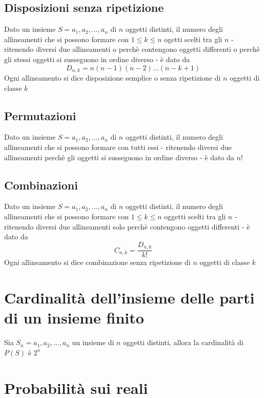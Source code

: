 \documentclass[12pt]{report}
\begin{document}
  \subsection{Disposizioni senza ripetizione}
  Dato un insieme $S={a_1,a_2,...,a_n}$ di $n$ oggetti distinti, il numero degli allineamenti che si possono formare con $1 \leq k \leq n$ ogetti scelti tra gli $n$ - ritenendo diversi due allineamenti o perchè contengono oggetti differenti o perchè gli stessi oggetti si susseguono in ordine diverso - è dato da
  \[ D_{n,k} = n(n-1)(n-2)...(n-k + 1) \]
  Ogni allineamento si dice disposizione semplice o senza ripetizione di $n$ oggetti di classe $k$

  \subsection{Permutazioni}
  Dato un insieme $S={a_1,a_2,...,a_n}$ di $n$ oggetti distinti, il numero degli allineamenti che si possono formare con tutti essi - ritenendo diversi due allineamenti perchè gli oggetti si susseguono in ordine diverso - è dato da $n!$

  \subsection{Combinazioni}
  Dato un insieme $S={a_1,a_2,...,a_n}$ di $n$ oggetti distinti, il numero degli allineamenti che si possono formare con $1 \leq k \leq n$ oggetti scelti tra gli $n$ - ritenendo diversi due allineamenti solo perchè contengono oggetti differenti - è dato da
  \[ C_{n,k} = \frac{D_{n,k}}{k!} \]
  Ogni allineamento si dice combinazione senza ripetizione di $n$ oggetti di classe $k$

  \section{Cardinalità dell'insieme delle parti di un insieme finito}
  Sia $S_n={a_1,a_2,...,a_n}$ un insieme di $n$ oggetti distinti, allora la cardinalità di $P(S)$ è $ 2^n$

  \section{Probabilità sui reali}
\end{document}
